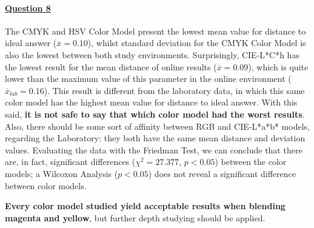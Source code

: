 \paragraph{\ul{Question 8}}
%
The CMYK and HSV Color Model present the lowest mean value for distance to ideal answer ($\overline{x} = 0.10$), whilst standard deviation for the CMYK Color Model is also the lowest between both study environments.
Surprisingly, CIE-L*C*h has the lowest result for the mean distance of online results ($\overline{x} = 0.09$), which is quite lower than the maximum value of this parameter in the online
environment ($\overline{x}_{lab} = 0.16$). This result is different from the laboratory data, in which this same color model has the highest mean value for distance to ideal answer. With
this said, \textbf{it is not safe to say that which color model had the worst results}. Also, there should be some sort of affinity between RGB and CIE-L*a*b* models, regarding the Laboratory: they both have the same mean distance and deviation values.
Evaluating the data with the Friedman Test, we can conclude that there are, in fact, significant differences ($\chi^2 = 27.377$, $p < 0.05$) between the color models; a Wilcoxon Analysis
($p < 0.05$) does not reveal a significant difference between color models. \par
%
\textbf{Every color model studied yield acceptable results when blending magenta and yellow}, but further depth studying should be applied.
%
